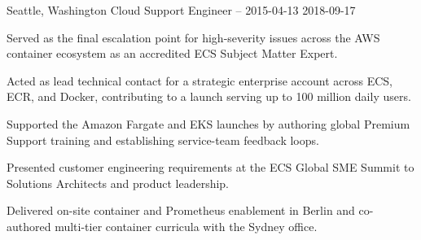 \begin{role}
{\companyaws}
{Seattle, Washington}
{Cloud Support Engineer  -- }
{2015-04-13}
{2018-09-17}
    \item Served as the final escalation point for high-severity issues across the AWS container ecosystem as an accredited ECS Subject Matter Expert.
    \item Acted as lead technical contact for a strategic enterprise account across ECS, ECR, and Docker, contributing to a launch serving up to 100 million daily users.
    \item Supported the Amazon Fargate and EKS launches by authoring global Premium Support training and establishing service-team feedback loops.
    \item Presented customer engineering requirements at the ECS Global SME Summit to Solutions Architects and product leadership.
    \item Delivered on-site container and Prometheus enablement in Berlin and co-authored multi-tier container curricula with the Sydney office.
\end{role}
